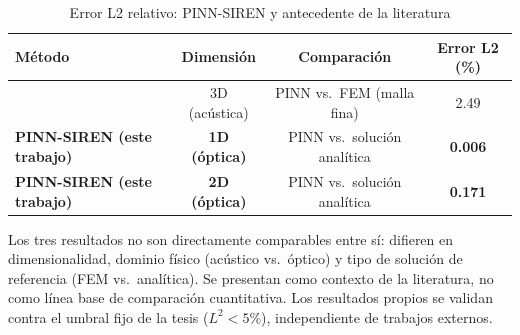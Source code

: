 \begin{table}[htbp]
\centering
\begin{threeparttable}
\caption{Error L2 relativo: PINN-SIREN y antecedente de la literatura}
\label{tab:comparativa}
\begin{tabular}{lccc}
\toprule
Método & Dimensión & Comparación & Error L2 (\%) \\
\midrule
\citet{Schoder2024_PINN_acoustics} & 3D (acústica) & PINN vs.\ FEM (malla fina) & 2.49 \\
\textbf{PINN-SIREN (este trabajo)} & \textbf{1D (óptica)} & PINN vs.\ solución analítica & \textbf{0.006} \\
\textbf{PINN-SIREN (este trabajo)} & \textbf{2D (óptica)} & PINN vs.\ solución analítica & \textbf{0.171} \\
\bottomrule
\end{tabular}
\begin{tablenotes}
\small
\item Los tres resultados no son directamente comparables entre sí: difieren en
      dimensionalidad, dominio físico (acústico vs.\ óptico) y tipo de solución
      de referencia (FEM vs.\ analítica). Se presentan como contexto de la
      literatura, no como línea base de comparación cuantitativa. Los resultados
      propios se validan contra el umbral fijo de la tesis ($L^2 < 5\%$),
      independiente de trabajos externos.
\end{tablenotes}
\end{threeparttable}
\end{table}
